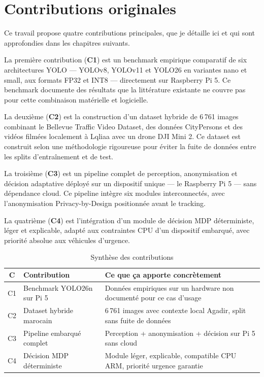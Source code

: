 \section{Contributions originales}

Ce travail propose quatre contributions
principales, que je détaille ici et qui
sont approfondies dans les chapitres
suivants.

La première contribution (\textbf{C1}) est
un benchmark empirique comparatif de six
architectures YOLO — YOLOv8, YOLOv11 et
YOLO26 en variantes nano et small, aux
formats FP32 et INT8 — directement sur
Raspberry Pi 5. Ce benchmark documente
des résultats que la littérature existante
ne couvre pas pour cette combinaison
matérielle et logicielle.

La deuxième (\textbf{C2}) est la construction
d'un dataset hybride de 6\,761 images
combinant le Bellevue Traffic Video Dataset,
des données CityPersons et des vidéos
filmées localement à Lqliaa avec un drone
DJI Mini 2. Ce dataset est construit selon
une méthodologie rigoureuse pour éviter
la fuite de données entre les splits
d'entraînement et de test.

La troisième (\textbf{C3}) est un pipeline
complet de perception, anonymisation et
décision adaptative déployé sur un dispositif
unique — le Raspberry Pi 5 — sans dépendance
cloud. Ce pipeline intègre six modules
interconnectés, avec l'anonymisation
Privacy-by-Design positionnée avant le
tracking.

La quatrième (\textbf{C4}) est l'intégration
d'un module de décision MDP déterministe,
léger et explicable, adapté aux contraintes
CPU d'un dispositif embarqué, avec priorité
absolue aux véhicules d'urgence.

\begin{table}[H]
\centering
\caption{Synthèse des contributions}
\begin{tabularx}{\textwidth}{clX}
\toprule
\textbf{C} & \textbf{Contribution} &
\textbf{Ce que ça apporte concrètement} \\
\midrule
C1 & Benchmark YOLO26n sur Pi 5 &
Données empiriques sur un hardware
non documenté pour ce cas d'usage \\
C2 & Dataset hybride marocain &
6\,761 images avec contexte local Agadir,
split sans fuite de données \\
C3 & Pipeline embarqué complet &
Perception + anonymisation + décision
sur Pi 5 sans cloud \\
C4 & Décision MDP déterministe &
Module léger, explicable, compatible
CPU ARM, priorité urgence garantie \\
\bottomrule
\end{tabularx}
\label{tab:contributions}
\end{table}

